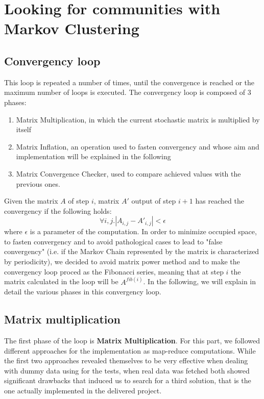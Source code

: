 \section{Looking for communities with Markov Clustering}
\label{mcl}


\subsection{Convergency loop}
This loop is repeated a number of times, until the convergence is reached or the maximum
number of loops is executed.
The convergency loop is composed of 3 phases:
\begin{enumerate}
\item Matrix Multiplication, in which the current stochastic matrix is multiplied by itself
\item Matrix Inflation, an operation used to fasten convergency and whose aim and implementation will be explained in the following
\item Matrix Convergence Checker, used to compare achieved values with the previous ones.
\end{enumerate}

Given the matrix $A$ of step $i$, matrix $A'$ output of step $i+1$ has reached the convergency
if the following holds:
$$
\forall i,j . |A_{i,j} - A'_{i,j}| < \epsilon
$$ 
where $\epsilon$ is a parameter of the computation.
In order to minimize occupied space, to fasten convergency and to avoid pathological
cases to lead to "false convergency" (i.e. if the Markov Chain represented by the
matrix is characterized by periodicity), we decided to avoid matrix power method 
and to make the convergency loop proced as the Fibonacci series, meaning
that at step $i$ the matrix calculated in the loop will be $A^{fib(i)}$.
In the following, we will explain in detail the various phases in this convergency
loop.

\subsection{Matrix multiplication}
The first phase of the loop is \textbf{Matrix Multiplication}. For this part, we followed different
approaches for the implementation as map-reduce computations. While the first two approaches
revealed themselves to be very effective when dealing with dummy data using for the tests,
when real data was fetched both showed significant drawbacks that induced us to search for
a third solution, that is the one actually implemented in the delivered project.

